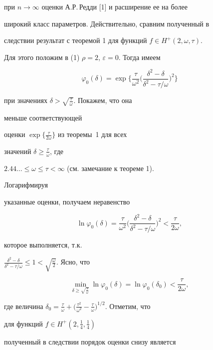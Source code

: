 при $n\to\infty$ оценки А.Р.\,Редди [1] и расширение ее на более  


широкий класс параметров. Действительно, сравним полученный в  


следствии результат с теоремой 1 для функций $f\in H^+(2,\omega,\tau)$. 


Для этого положим в (1) $\rho=2$, $\varepsilon=0$. Тогда имеем 


$$ 


\varphi_0(\delta)=\exp\bigg\{\frac{\tau}{\omega^2}\bigg( 


\frac{\delta^2-\delta}{\delta^2-\tau/\omega}\bigg)^2\bigg\} 


$$ 


при значениях $\delta>\sqrt{\frac{\tau}{\omega}}$. Покажем, что она 


меньше соответствующей 


оценки $\exp\big\{\frac{\tau}{2\omega}\big\}$ из теоремы~1 для всех 


значений $\delta\ge\frac{\tau}{\omega}$, где  


$2.44\dotsc\le\omega\le\tau<\infty$ (см. замечание к теореме 1). 


Логарифмируя  


указанные оценки, получаем неравенство 


$$ 


\ln\varphi_0(\delta)=\frac{\tau}{\omega^2}\bigg( 


\frac{\delta^2-\delta}{\delta^2-\tau/\omega}\bigg)^2< 


\frac{\tau}{2\omega}, 


$$ 


которое выполняется, т.к. 


$\frac{\delta^2-\delta}{\delta^2-\tau/\omega}\le 


1<\sqrt{\frac{\omega}{2}}$. Ясно, что 


$$ 


\min_{\delta\ge\sqrt{\frac{\tau}{\omega}}} 


\ln\varphi_0(\delta)=\ln\varphi_0(\delta_0)< 


\frac{\tau}{2\omega}, 


$$ 


где величина $\delta_0=\frac{\tau}{\omega}+\big( 


\frac{\tau^2}{\omega^2}-\frac{\tau}{\omega}\big)^{1/2}$. Отметим, что 


для функций $f\in H^+(2,\frac{1}{4},\frac{1}{4})$ 


полученный в следствии порядок оценки снизу является  


